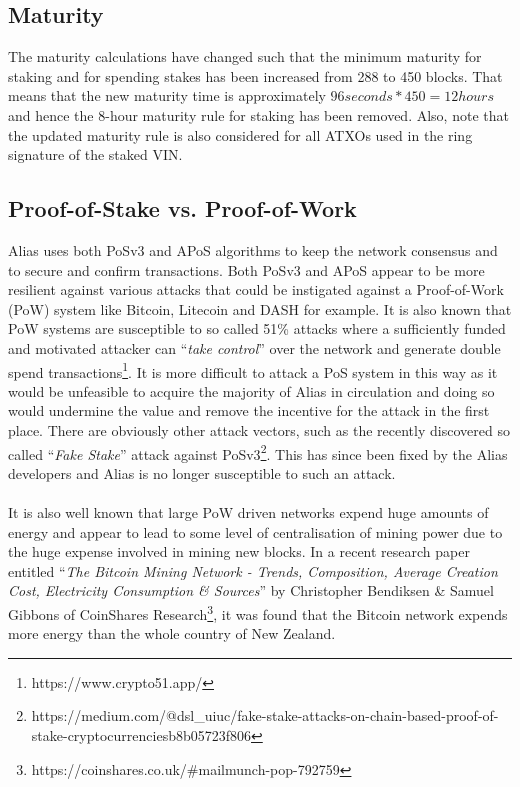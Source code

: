 \subsection{Maturity}
The maturity calculations have changed such that the minimum maturity for
staking and for spending stakes has been increased from 288 to 450 blocks. That means that the new maturity time is approximately $96 seconds * 450 = 12 hours$ and hence the 8-hour maturity rule for staking has been removed. Also, note that the updated maturity rule is also considered for all ATXOs used in the ring signature
of the staked VIN.
\newpage

\subsection{Proof-of-Stake vs. Proof-of-Work}
Alias uses both PoSv3 and APoS algorithms to keep the network consensus and to secure and confirm transactions. Both PoSv3 and APoS appear to be more resilient against various attacks that could be instigated against a Proof-of-Work (PoW) system like Bitcoin, Litecoin and DASH for example. It is also known that PoW systems are susceptible to so called 51\% attacks where a sufficiently funded and motivated attacker can “\textit{take control}” over the network and generate double spend transactions\footnote{https://www.crypto51.app/}. It is more difficult to attack a PoS system in this way as it would be unfeasible to acquire the majority of Alias in circulation and doing so would undermine the value and remove the incentive for the attack in the first place. There are obviously other attack vectors, such as the recently discovered so called “\textit{Fake Stake}” attack against PoSv3\footnote{https://medium.com/@dsl\_uiuc/fake-stake-attacks-on-chain-based-proof-of-stake-cryptocurrenciesb8b05723f806}. This has since been fixed by the Alias developers and Alias is no longer susceptible to such an attack.
\\
\\
\noindent
It is also well known that large PoW driven networks expend huge amounts of energy and appear to lead to some level of centralisation of mining power due to the huge expense involved in mining new blocks. In a recent research paper entitled “\textit{The Bitcoin Mining Network - Trends, Composition, Average Creation Cost, Electricity Consumption \& Sources}” by Christopher Bendiksen \& Samuel Gibbons of CoinShares  Research\footnote{https://coinshares.co.uk/\#mailmunch-pop-792759}, 
it was found that the Bitcoin network expends more energy than the whole country of New Zealand.
